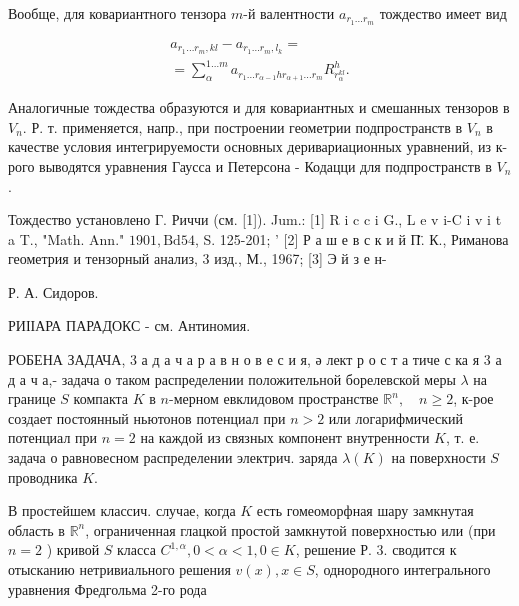 \documentclass[10pt]{article}
\begin{document}
Вообще, для ковариантного тензора $m$-й валентности $a_{r_{1} \ldots r_{m}}$ тождество имеет вид



\[

\begin{gathered}

a_{r_{1} \ldots r_{m}, k l}-a_{r_{1} \ldots r_{m}, l_{k}}= \\

=\sum_{\alpha}^{1 \ldots m} a_{r_{1} \ldots r_{\alpha-1} h r_{\alpha+1} \ldots r_{m}} R_{r_{\alpha}^{k l}}^{h} .

\end{gathered}

\]



Аналогичные тождества образуются и для ковариантных и смешанных тензоров в $V_{n}$. Р. т. применяется, напр., при построении геометрии подпространств в $V_{n}$ в качестве условия интегрируемости основных деривариационных уравнений, из к-рого выводятся уравнения Гаусса и Петерсона - Кодацци для подпространств в $V_{n}$.



Тождество установлено Г. Риччи (см. [1]). Jum.: [1] R i c c i G., L e v i-C i v i t a T., "Math. Ann." $1901, \mathrm{Bd} 54$, S. 125-201; ' [2] Р а ш е в с к и й П̈. К., Риманова геометрия и тензорный анализ, 3 изд., М., 1967; [3] Э й з е н-



Р. А. Сидоров.



РИІІАРА ПАРАДОКС - см. Антиномия.



РОБЕНА ЗАДАЧА, 3 а д а ч а р а в н о в е с и я, ә лект р о с т а тиче с ка я 3 а д а ч а,- задача о таком распределении положительной борелевской меры $\lambda$ на границе $S$ компакта $K$ в $n$-мерном евклидовом пространстве $\mathbb{R}^{n}, \quad n \geqslant 2$, к-рое создает постоянный ньютонов потенциал при $n>2$ или логарифмический потенциал при $n=2$ на каждой из связных компонент внутренности $K$, т. е. задача о равновесном распределении электрич. заряда $\lambda(K)$ на поверхности $S$ проводника $K$.



В простейшем классич. случае, когда $K$ есть гомеоморфная шару замкнутая область в $\mathbb{R}^{n}$, ограниченная глацкой простой замкнутой поверхностью или (при $n=2$ ) кривой $S$ класса $C^{1, \alpha}, 0<\alpha<1,0 \in K$, решение Р. 3. сводится к отысканию нетривиального решения $v(x), x \in S$, однородного интегрального уравнения Фредгольма 2-го рода
\end{document}
